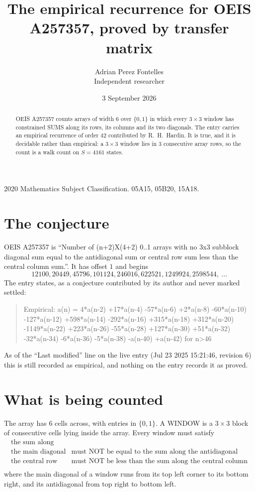 \documentclass[11pt,a4paper]{article}
\title{The empirical recurrence for OEIS A257357, proved by transfer matrix}
\author{Adrian Perez Fontelles\\ \small Independent researcher}
\date{3 September 2026}
\theoremstyle{plain}
\theoremstyle{definition}
\begin{document}
\maketitle

\begin{abstract}
OEIS A257357 counts arrays of width $6$ over $\{0,1\}$ in which every $3\times3$ window has
constrained SUMS along its rows, its columns and its two diagonals. The entry carries an
empirical recurrence of order $42$ contributed by R.~H.~Hardin. It is true, and it is
decidable rather than empirical: a $3\times3$ window lies in $3$ consecutive array rows,
so the count is a walk count on $S=4161$ states.
\end{abstract}

\noindent\small 2020 Mathematics Subject Classification. 05A15, 05B20, 15A18.\normalsize

\section{The conjecture}

OEIS A257357 is ``Number of (n+2)X(4+2) 0..1 arrays with no 3x3 subblock diagonal sum equal to the antidiagonal sum or central row sum less than the central column sum.''. It has offset $1$ and begins
\[
12100, 20449, 45796, 101124, 246016, 622521, 1249924, 2598544,\ \dots
\]
The entry states, as a conjecture contributed by its author and never marked settled:
\begin{quote}
Empirical: a(n) = 4*a(n-2) +17*a(n-4) -57*a(n-6) +2*a(n-8) -60*a(n-10) -127*a(n-12) +598*a(n-14) -292*a(n-16) +315*a(n-18) +312*a(n-20) -1149*a(n-22) +223*a(n-26) -55*a(n-28) +127*a(n-30) +51*a(n-32) -32*a(n-34) -6*a(n-36) -5*a(n-38) -a(n-40) +a(n-42) for n>46
\end{quote}
As of the ``Last modified'' line on the live entry (Jul 23 2025 15:21:46, revision 6) this is still
recorded as empirical, and nothing on the entry records it as proved.

\section{What is being counted}

The array has $6$ cells across, with entries in $\{0,1\}$. A WINDOW is a $3\times3$ block
of consecutive cells lying inside the array. Every window must satisfy
\[
\begin{array}{ll}
\text{the sum along} & \text{} \\[2pt]
\text{the main diagonal} & \text{must NOT be equal to the sum along the antidiagonal} \\
\text{the central row} & \text{must NOT be less than the sum along the central column} \\
\end{array}
\]
where the main diagonal of a window runs from its top left corner to its bottom right, and its
antidiagonal from top right to bottom left.
\end{document}
